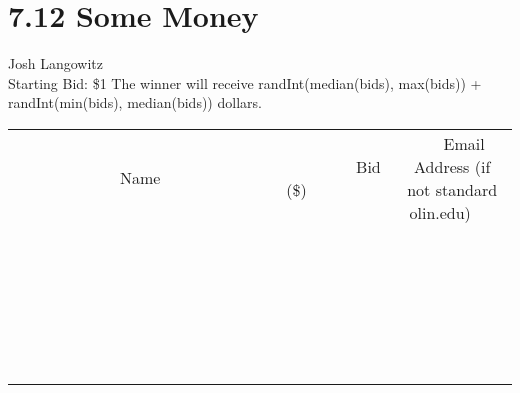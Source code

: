 \documentclass[11pt]{article}
\begin{document}
\section*{7.12 Some Money}
Josh Langowitz
\\
Starting Bid: \$1
\newline
The winner will receive randInt(median(bids), max(bids)) + randInt(min(bids), median(bids)) dollars.
\\[6ex]
\begin{tabular}{c c c}
~~~~~~~~~~~~~Name~~~~~~~~~~~~~ & ~~~~~~~~~Bid (\$)~~~~~~~~~  & ~~~Email Address (if not standard olin.edu)~~~\\
 & & \\
\hline
 & & \\
\hline
 & & \\
\hline
 & & \\
\hline
 & & \\
\hline
 & & \\
\hline
 & & \\
\hline
 & & \\
\hline
 & & \\
\hline
 & & \\
\hline
 & & \\
\hline
 & & \\
\hline
 & & \\
\hline
 & & \\
\hline
 & & \\
\hline
 & & \\
\hline
 & & \\
\hline
 & & \\
\hline
 & & \\
\hline
 & & \\
\hline
 & & \\
\hline
 & & \\
\hline
 & & \\
\hline
 & & \\
\hline
 & & \\
\hline
 & & \\
\hline
\end{tabular}
\newpage
\end{document}
